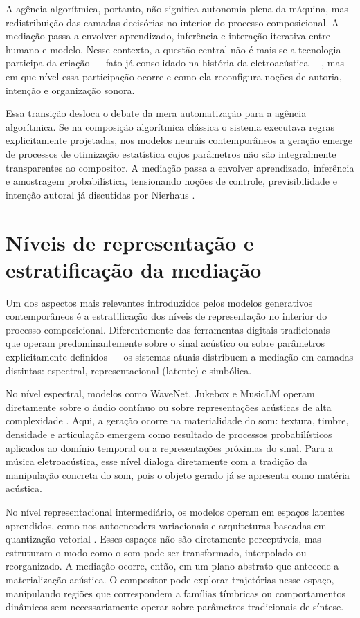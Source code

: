 A agência algorítmica, portanto, não significa autonomia plena da máquina, mas redistribuição das camadas decisórias no interior do processo composicional. A mediação passa a envolver aprendizado, inferência e interação iterativa entre humano e modelo. Nesse contexto, a questão central não é mais se a tecnologia participa da criação — fato já consolidado na história da eletroacústica —, mas em que nível essa participação ocorre e como ela reconfigura noções de autoria, intenção e organização sonora.


Essa transição desloca o debate da mera automatização para a agência algorítmica. Se na composição algorítmica clássica o sistema executava regras explicitamente projetadas, nos modelos neurais contemporâneos a geração emerge de processos de otimização estatística cujos parâmetros não são integralmente transparentes ao compositor. A mediação passa a envolver aprendizado, inferência e amostragem probabilística, tensionando noções de controle, previsibilidade e intenção autoral já discutidas por Nierhaus \cite{nierhaus2009algorithmiccomposition}.

\section{Níveis de representação e estratificação da mediação}

Um dos aspectos mais relevantes introduzidos pelos modelos generativos contemporâneos é a estratificação dos níveis de representação no interior do processo composicional. Diferentemente das ferramentas digitais tradicionais — que operam predominantemente sobre o sinal acústico ou sobre parâmetros explicitamente definidos — os sistemas atuais distribuem a mediação em camadas distintas: espectral, representacional (latente) e simbólica.

No nível espectral, modelos como WaveNet, Jukebox e MusicLM operam diretamente sobre o áudio contínuo ou sobre representações acústicas de alta complexidade \cite{oord2016wavenet,dhariwal2020jukebox,agostinelli2023musiclm}. Aqui, a geração ocorre na materialidade do som: textura, timbre, densidade e articulação emergem como resultado de processos probabilísticos aplicados ao domínio temporal ou a representações próximas do sinal. Para a música eletroacústica, esse nível dialoga diretamente com a tradição da manipulação concreta do som, pois o objeto gerado já se apresenta como matéria acústica.

No nível representacional intermediário, os modelos operam em espaços latentes aprendidos, como nos autoencoders variacionais e arquiteturas baseadas em quantização vetorial \cite{oord2017vqvae,engel2017nsynth}. Esses espaços não são diretamente perceptíveis, mas estruturam o modo como o som pode ser transformado, interpolado ou reorganizado. A mediação ocorre, então, em um plano abstrato que antecede a materialização acústica. O compositor pode explorar trajetórias nesse espaço, manipulando regiões que correspondem a famílias tímbricas ou comportamentos dinâmicos sem necessariamente operar sobre parâmetros tradicionais de síntese.

